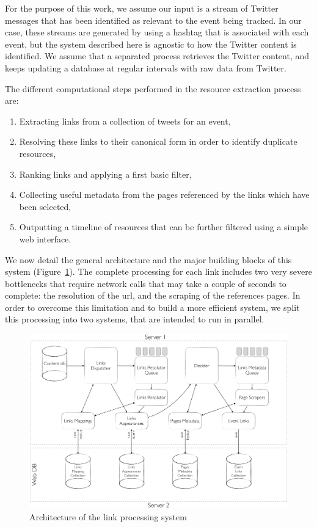 \documentclass{sig-alternate-somus}
\begin{document}
For the purpose of this work, we assume our input is a stream of Twitter messages that has been identified as relevant to the event being tracked. In our case, these streams are generated by using a hashtag that is associated with each event, but the system described here is agnostic to how the Twitter content is identified. We assume that a separated process retrieves the Twitter content, and keeps updating a database at regular intervals with raw data from Twitter.

The different computational steps performed in the resource extraction process are:
\begin{enumerate}
 \item Extracting links from a collection of tweets for an event,
 \item Resolving these links to their canonical form in order to identify duplicate resources,
 \item Ranking links and applying a first basic filter,
 \item Collecting useful metadata from the pages referenced by the links which have been selected,
 \item Outputting a timeline of resources that can be further filtered using a simple web interface.
\end{enumerate}

We now detail the general architecture and the major building blocks of this system (Figure~\ref{fig:architecture}). The complete processing for each link includes two very severe bottlenecks that require network calls that may take a couple of seconds to complete: the resolution of the url, and the scraping of the references pages. In order to overcome this limitation and to build a more efficient system, we split this processing into two systems, that are intended to run in parallel.

\begin{figure}[htbp]
  \centering
  \includegraphics[width=\columnwidth]{Figures/links_processing_architecture.png}
  \caption{Architecture of the link processing system}
  \label{fig:architecture}
\end{figure}
\end{document}
